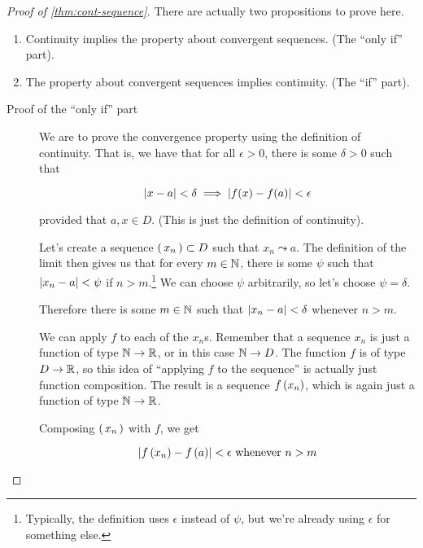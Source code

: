 \begin{proof}[Proof of \cref{thm:cont-sequence}]
  There are actually two propositions to prove here.

  \begin{enumerate}
  \item Continuity implies the property about convergent sequences. (The ``only
    if'' part).
  \item The property about convergent sequences implies continuity. (The ``if''
    part).
  \end{enumerate}

  \begin{description}
  \item[Proof of the ``only if'' part] We are to prove the convergence property
    using the definition of continuity. That is, we have that for all
    $\epsilon > 0$, there is some $\delta > 0$ such that

    \begin{equation}
      \left| x - a \right| < \delta \implies \left| f(x) - f(a) \right| < \epsilon
    \end{equation}

    provided that $a, x \in D$. (This is just the definition of continuity).

    Let's create a sequence $\left(\, x_n \,\right) \subset D$ such that $x_n \leadsto a$.
    The definition of the limit then gives us that for every $m \in \mathbb{N}$, there
    is some $\psi$ such that $\left| x_n - a \right| < \psi$ if
    $n > m$.\footnote{Typically, the definition uses $\epsilon$ instead of
      $\psi$, but we're already using $\epsilon$ for something else.} We can
    choose $\psi$ arbitrarily, so let's choose $\psi = \delta$.

    Therefore there is some $m \in \mathbb{N}$ such that $\left| x_n - a \right| < \delta$
    whenever $n > m$.

    We can apply $f$ to each of the $x_n$s. Remember that a sequence $x_n$ is
    just a function of type $\mathbb{N} \to \mathbb{R}$, or in this case $\mathbb{N} \to D$. The
    function $f$ is of type $D \to \mathbb{R}$, so this idea of ``applying $f$ to the
    sequence'' is actually just function composition. The result is a sequence
    $f \left( x_n \right)$, which is again just a function of type $\mathbb{N} \to \mathbb{R}$.

    Composing $\left(\, x_n \,\right)$ with $f$, we get

    \begin{equation}
      \left| f \left( x_n \right) - f \left( a \right) \right| < \epsilon \text{ whenever } n > m
    \end{equation}


\end{description}
\end{proof}
